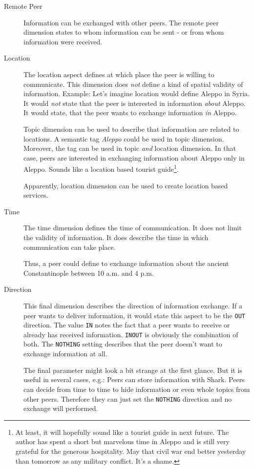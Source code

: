 \begin{description}
    \item[Remote Peer] Information can be exchanged with other peers. The remote peer dimension states to whom information can be sent - or from whom information were received.

    \item[Location] 
The location aspect defines at which place the peer is willing to communicate. This dimension does {\it not} define a kind of spatial validity of information. Example: Let's imagine location would define Aleppo in Syria. It would {\it not} state that the peer is interested in information {\it about} Aleppo. It would state, that the peer wants to exchange information {\it in} Aleppo.

Topic dimension can be used to describe that information are related to locations. A semantic tag {\it Aleppo} could be used in topic dimension. Moreover, the tag can be used in topic {\it and} location dimension. In that case, peers are interested in exchanging information about Aleppo only in Aleppo. Sounds like a location based tourist guide\footnote{At least, it will hopefully sound like a tourist guide in next future. The author has spent a short but marvelous time in Aleppo and is still very grateful for the generous hospitality. May that civil war end better yesterday than tomorrow as any military conflict. It's a shame.}.

Apparently, location dimension can be used to create location based services.

    \item[Time] 
The time dimension defines the time of communication. It does not limit the validity of information. It does describe the time in which communication can take place.

Thus, a peer could define to exchange information about the ancient Constantinople between 10 a.m. and 4 p.m.

    \item[Direction] 
This final dimension describes the direction of information exchange. If a peer wants to deliver information, it would state this aspect to be the {\tt OUT} direction. The value {\tt IN} notes the fact that a peer wants to receive or already has received information. {\tt INOUT} is obviously the combination of both. The {\tt NOTHING} setting describes that the peer doesn't want to exchange information at all.

The final parameter might look a bit strange at the first glance. But it is useful in several cases, e.g.: Peers can store information with Shark. Peers can decide from time to time to hide information or even whole topics from other peers. Therefore they can just set the {\tt NOTHING} direction and no exchange will performed.

\end{description}

